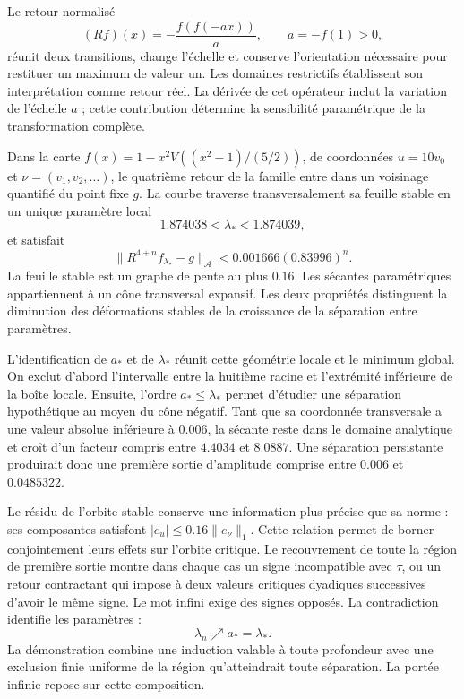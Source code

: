 Le retour normalisé
\[
(Rf)(x)=-\frac{f(f(-ax))}{a},\qquad a=-f(1)>0,
\]
réunit deux transitions, change l’échelle et conserve l’orientation nécessaire
pour restituer un maximum de valeur un. Les domaines restrictifs établissent
son interprétation comme retour réel. La dérivée de cet opérateur inclut
la variation de l’échelle \(a\) ; cette contribution détermine la sensibilité
paramétrique de la transformation complète.

Dans la carte \(f(x)=1-x^2V((x^2-1)/(5/2))\), de coordonnées \(u=10v_0\)
et \(\nu=(v_1,v_2,\ldots)\), le quatrième retour de la famille entre dans un
voisinage quantifié du point fixe \(g\). La courbe traverse transversalement
sa feuille stable en un unique paramètre local
\[
1.874038<\lambda_*<1.874039,
\]
et satisfait
\[
\|R^{4+n}f_{\lambda_*}-g\|_{\mathcal A}
<0.001666(0.83996)^n.
\]
La feuille stable est un graphe de pente au plus \(0.16\). Les
sécantes paramétriques appartiennent à un cône transversal expansif. Les deux
propriétés distinguent la diminution des déformations stables de la
croissance de la séparation entre paramètres.

L’identification de \(a_*\) et de \(\lambda_*\) réunit cette géométrie locale
et le minimum global. On exclut d’abord l’intervalle entre la huitième racine
et l’extrémité inférieure de la boîte locale. Ensuite, l’ordre
\(a_*\le\lambda_*\) permet d’étudier une séparation hypothétique au moyen
du cône négatif. Tant que sa coordonnée transversale a une valeur absolue inférieure
à \(0.006\), la sécante reste dans le domaine analytique et croît d’un
facteur compris entre \(4.4034\) et \(8.0887\). Une séparation persistante
produirait donc une première sortie d’amplitude comprise entre
\(0.006\) et \(0.0485322\).

Le résidu de l’orbite stable conserve une information plus précise que sa
norme : ses composantes satisfont \(|e_u|\le0.16\|e_\nu\|_1\). Cette
relation permet de borner conjointement leurs effets sur l’orbite critique.
Le recouvrement de toute la région de première sortie montre dans chaque cas un
signe incompatible avec \(\tau\), ou un retour contractant qui impose à deux
valeurs critiques dyadiques successives d’avoir le même signe. Le mot
infini exige des signes opposés. La contradiction identifie les paramètres :
\[
\lambda_n\nearrow a_*=\lambda_*.
\]
La démonstration combine une induction valable à toute profondeur avec une
exclusion finie uniforme de la région qu’atteindrait toute
séparation. La portée infinie repose sur cette composition.

